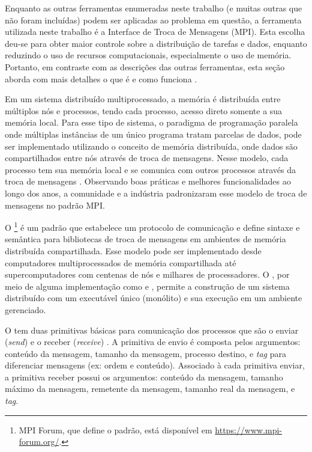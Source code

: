 Enquanto as outras ferramentas enumeradas neste trabalho (e muitas outras que
não foram incluídas) podem ser aplicadas ao problema em questão, a ferramenta
utilizada neste trabalho é a Interface de Troca de Mensagens (MPI).
Esta escolha deu-se para obter maior controle sobre a distribuição de tarefas e
dados, enquanto reduzindo o uso de recursos computacionais, especialmente o uso
de memória.
Portanto, em contraste com as descrições das outras ferramentas, esta seção
aborda com mais detalhes o que é e como funciona \mpi.

Em um sistema distribuído multiprocessado, a memória é distribuída entre
múltiplos nós e processos, tendo cada processo, acesso direto somente a sua memória
local.
Para esse tipo de sistema, o paradigma de programação paralela \spmd onde
múltiplas instâncias de um único programa tratam parcelas de dados, pode ser
implementado utilizando o conceito de memória distribuída, onde dados são
compartilhados entre nós através de troca de mensagens.
Nesse modelo, cada
processo tem sua memória local e se comunica com outros processos através da
troca de mensagens \cite{MpiMitBookGroupp2014}.
Observando boas práticas e melhores funcionalidades ao longo dos anos, a
comunidade e a indústria padronizaram esse modelo de troca de mensagens no
padrão \acf{MPI}.

O \mpi\footnote{
    MPI Forum, que define o padrão, está disponível em \url{https://www.mpi-forum.org/}.
} é um padrão que
estabelece um protocolo de comunicação e define sintaxe e semântica para
bibliotecas de troca de mensagens em ambientes de memória distribuída compartilhada.
Esse modelo pode ser implementado desde computadores multiprocessados de memória
compartilhada até supercomputadores com centenas de nós e milhares de
processadores.
O \mpi, por meio de alguma implementação como  e
, permite a construção de um sistema distribuído com um
executável único (monólito) e sua execução em um ambiente gerenciado.

O \mpi tem duas primitivas básicas para comunicação dos processos que são o
enviar (\emph{send}) e o receber (\emph{receive}) \cite{MpiMitBookGroupp2014}.
A primitiva de envio é composta pelos argumentos: conteúdo da mensagem, tamanho
da mensagem, processo destino, e \emph{tag} para diferenciar mensagens (ex:
ordem e conteúdo).
Associado à cada primitiva enviar, a primitiva receber possui os argumentos:
conteúdo da mensagem, tamanho máximo da mensagem, remetente da mensagem, tamanho
real da mensagem, e \emph{tag}.

